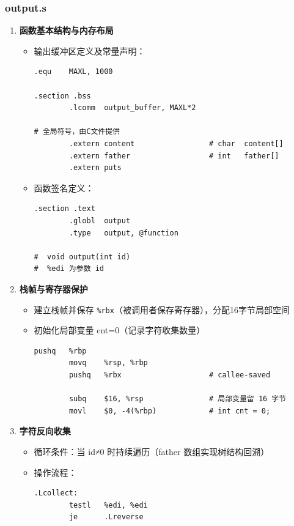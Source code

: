 \documentclass[10pt,a4paper]{article}
\begin{document}
\subsubsection{output.s}

\begin{enumerate}
    \item \textbf{函数基本结构与内存布局}
    \begin{itemize}
        \item 输出缓冲区定义及常量声明：
        \begin{lstlisting}[language={[x86masm]Assembler}]
.equ    MAXL, 1000

.section .bss
        .lcomm  output_buffer, MAXL*2

# 全局符号，由C文件提供
        .extern content                 # char  content[]
        .extern father                  # int   father[]
        .extern puts
        \end{lstlisting}
        \item 函数签名定义：
        \begin{lstlisting}[language={[x86masm]Assembler}]
.section .text
        .globl  output
        .type   output, @function

#  void output(int id)
#  %edi 为参数 id
        \end{lstlisting}
    \end{itemize}
    
    \item \textbf{栈帧与寄存器保护}
    \begin{itemize}
        \item 建立栈帧并保存 \verb|%rbx|（被调用者保存寄存器），分配16字节局部空间
        \item 初始化局部变量 cnt=0（记录字符收集数量）
        \begin{lstlisting}[language={[x86masm]Assembler}]
        pushq   %rbp
        movq    %rsp, %rbp
        pushq   %rbx                    # callee-saved

        subq    $16, %rsp               # 局部变量留 16 字节
        movl    $0, -4(%rbp)            # int cnt = 0;
        \end{lstlisting}
    \end{itemize}
    
    \item \textbf{字符反向收集}
    \begin{itemize}
        \item 循环条件：当 id≠0 时持续遍历（father 数组实现树结构回溯）
        \item 操作流程：
        \begin{lstlisting}[language={[x86masm]Assembler}]
.Lcollect:
        testl   %edi, %edi
        je      .Lreverse


\end{lstlisting}
\end{itemize}
\end{enumerate}
\end{document}
